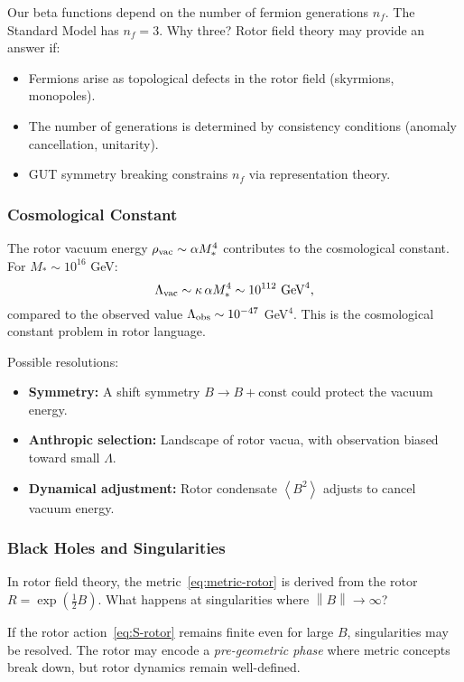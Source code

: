 \documentclass[11pt,a4paper]{article}
\numberwithin{equation}{section}
\theoremstyle{plain}
\theoremstyle{definition}
\theoremstyle{remark}
\newcommand{\norm}[1]{\left\lVert#1\right\rVert}
\newcommand{\avg}[1]{\left\langle #1 \right\rangle}
\begin{document}
Our beta functions depend on the number of fermion generations $n_f$. The Standard Model has $n_f=3$. Why three? Rotor field theory may provide an answer if:
\begin{itemize}
  \item Fermions arise as topological defects in the rotor field (skyrmions, monopoles).
  \item The number of generations is determined by consistency conditions (anomaly cancellation, unitarity).
  \item GUT symmetry breaking constrains $n_f$ via representation theory.
\end{itemize}

\subsubsection{Cosmological Constant}

The rotor vacuum energy $\rho_{\rm vac}\sim \alpha M_*^4$ contributes to the cosmological constant. For $M_*\sim 10^{16}$ GeV:
\begin{equation}
\Lambda_{\rm vac} \sim \kappa\,\alpha M_*^4 \sim 10^{112}\text{ GeV}^4,
\label{eq:Lambda-vac}
\end{equation}
compared to the observed value $\Lambda_{\rm obs}\sim 10^{-47}$ GeV$^4$. This is the cosmological constant problem in rotor language.

Possible resolutions:
\begin{itemize}
  \item \textbf{Symmetry:} A shift symmetry $B\to B+\text{const}$ could protect the vacuum energy.
  \item \textbf{Anthropic selection:} Landscape of rotor vacua, with observation biased toward small $\Lambda$.
  \item \textbf{Dynamical adjustment:} Rotor condensate $\avg{B^2}$ adjusts to cancel vacuum energy.
\end{itemize}

\subsubsection{Black Holes and Singularities}

In rotor field theory, the metric~\eqref{eq:metric-rotor} is derived from the rotor $R=\exp(\tfrac12 B)$. What happens at singularities where $\norm{B}\to\infty$?

If the rotor action~\eqref{eq:S-rotor} remains finite even for large $B$, singularities may be resolved. The rotor may encode a \emph{pre-geometric phase} where metric concepts break down, but rotor dynamics remain well-defined.
\end{document}
